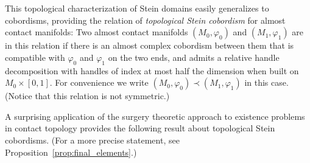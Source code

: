 \documentclass[12pt]{amsart}
\newtheorem{Theorem}{Theorem}[section]
\theoremstyle{remark}
\newcommand{\jbcomm}[1]{\begingroup\color{green}JB:~#1\endgroup}
\begin{document}
\begin{comment}
In \cite{BCS2} we gave a bordism theoretic characterisation of when a
given almost contact manifold can bound a Stein manifold. (For more on
this construction see \cite{BCS2} and a short recollection in
Section~\ref{subsec:obstruction}.) By a slight extension of the
theory, similar methods provide a bordism theoretic characterisation
for the existence of almost complex cobordisms between almost contact
manifolds, where the cobordism admits relative handle decomposition
with handles of index at most half the dimension.  Using this
extension \jbcomm{This is a bit of a lie... Also this paragraph is a
  bit schizophrenic}, 
\end{comment}

This topological characterization of Stein domains easily generalizes to 
cobordisms, providing 
the relation of
\emph{topological Stein cobordism} for almost contact manifolds: Two
almost contact manifolds $(M_0,\varphi _0)$ and $(M_1,\varphi_1)$ are in
this relation if there is an almost complex cobordism between them
that is compatible with $\varphi _0$ and 
$\varphi _1$ on the two ends, and admits a relative handle decomposition with
handles of index at most half the dimension when built on
$M_0\times [0,1]$. For convenience we write
$(M_0,\varphi _0) \prec (M_1,\varphi_1)$ in this case.  (Notice that
this relation is not symmetric.)  

\begin{comment}
In this langauge the main result of \cite{BCS1} shows that for a
contact manifold $(M, \xi )$ (and for appropriate almost contact
structures $\phi _T$ and $\phi _S$) we have $(M\times T^2, \phi
_T)\prec (M\times S^2, \phi _S)$. This approach allows the following
variant of the main result of \cite{BCS1}. (For a slightly more
general version of the statement, see
Corollary~\ref{cor:weak_product}.)

\begin{Theorem}\label{thm:mandmtimess2}
Suppose that the contact $(2q{+}1)$-manifold $(M, \xi )$ is weakly
fillable, and $\pi _2(M)=0$. Then the product $M\times S^2$ admits a
weakly fillable contact structure.
\end{Theorem}
\end{comment}

A surprising application of the surgery theoretic approach to 
existence problems in contact topology provides the following result
about topological Stein cobordisms.
(For a more precise statement, see Proposition~\ref{prop:final_elements}.)
\end{document}
